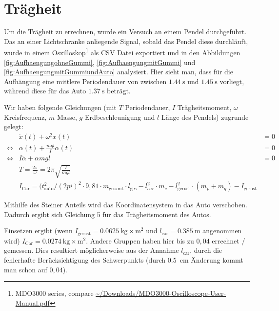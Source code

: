 \documentclass[10pt]{article}
\begin{document}
\section{Trägheit}
Um die Trägheit zu errechnen, wurde ein Versuch an einem Pendel durchgeführt.
Das an einer Lichtschranke anliegende Signal, sobald das Pendel diese durchläuft, wurde in einem Oszilloskop\footnote{MDO3000 series, compare \url{~/Downloads/MDO3000-Oscilloscope-User-Manual.pdf}} als CSV Datei exportiert und in den Abbildungen \ref{fig:AufhaengungohneGummi}, \ref{fig:AufhaengungmitGummi} und \ref{fig:AufhaengungmitGummiundAuto} analysiert.
Hier sieht man, dass für die Aufhängung eine mittlere Periodendauer von zwischen $\SI{1,44}{\second}$ und $\SI{1,45}{\second}$ vorliegt, während diese für das Auto $\SI{1,37}{\second}$ beträgt.

Wir haben folgende Gleichungen (mit $T$ Periodendauer, $I$ Trägheitsmoment, $\omega$ Kreisfrequenz, $m$ Masse, $g$ Erdbeschleunigung und $l$ Länge des Pendels) zugrunde gelegt:
\begin{eqnarray}
    &\ddot{x}(t) + \omega^2x(t)& = 0 \\
    \Leftrightarrow &\ddot{\alpha}(t) + \frac{mgl}{I}\alpha(t)& = 0 \\
    \Leftrightarrow &I\ddot{\alpha} + \alpha mgl& = 0 \\
     &T=\frac{2\pi}{\omega} = 2\pi\sqrt{\frac{I}{mgl}}\\
    &I_{\text{Car}}=(t_{\text{auto}}^2/(2pi)^2\cdot 9,81\cdot m_{\text{gesamt}}\cdot l_{\text{ges}}-l_{car}^2\cdot m_c-l_{\text{gerüst}}^2\cdot (m_p+m_g)-I_{\text{gerüst}}
\end{eqnarray}

Mithilfe des Steiner Anteils wird das Koordinatensystem in das Auto verschoben. Dadurch ergibt sich Gleichung 5 für das Trägheitsmoment des Autos.


Einsetzen ergibt (wenn $I_{\text{gerüst}} = \SI{0,0625}{\kilogram\times\m^2}$ und $l_{\text{car}} = \SI{0,385}{\m}$ angenommen wird) $I_{\text{Car}} = \SI{0,0274}{\kilogram\times\m^2}$. Andere Gruppen haben hier bis zu $0,04$ errechnet / gemessen. Dies resultiert möglicherweise aus der Annahme $l_{\text{car}}$, durch die fehlerhafte Berücksichtigung des Schwerpunkts (durch \SI{0,5}{\cm} Änderung kommt man schon auf $0,04$).
\end{document}
